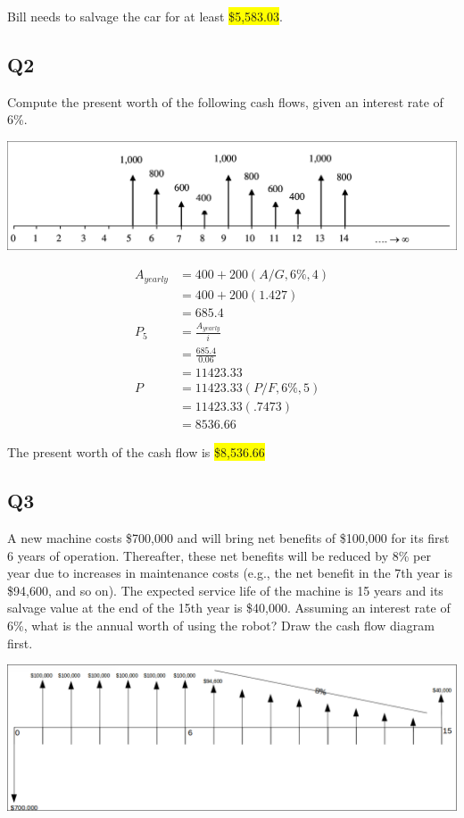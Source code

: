 \documentclass[12pt]{article}
\newcommand{\hilight}[1]{\colorbox{yellow}{#1}}
\begin{document}
Bill needs to salvage the car for at least \hilight{\$5,583.03}.

\subsection*{Q2}
Compute the present worth of the following cash flows, given an interest rate of 6\%.
\begin{center}
\includegraphics[width=15cm]{q2.png}
\end{center}
\begin{align*}
A_{yearly} &= 400 + 200(A/G, 6\%, 4)\\
&= 400 + 200(1.427)\\
&= 685.4\\
P_5 &= \frac{A_{yearly}}{i}\\
&= \frac{685.4}{0.06}\\
&=11423.33\\
P&=11423.33(P/F, 6\%, 5)\\
&=11423.33(.7473)\\
&=8536.66
\end{align*}

The present worth of the cash flow is \hilight{\$8,536.66}

\subsection*{Q3}
A new machine costs \$700,000 and will bring net benefits of \$100,000 for its first 6
years of operation. Thereafter, these net benefits will be reduced by 8\% per year due to increases in maintenance costs (e.g., the net benefit in the 7th year is \$94,600, and so on). The expected service life of the machine is 15 years and its salvage value at the end of the 15th year is \$40,000. Assuming an interest rate of 6\%, what is the annual worth of using the robot? Draw the cash flow diagram first.
\begin{center}
\includegraphics[width=15cm]{q3.png}
\end{center}
\end{document}
